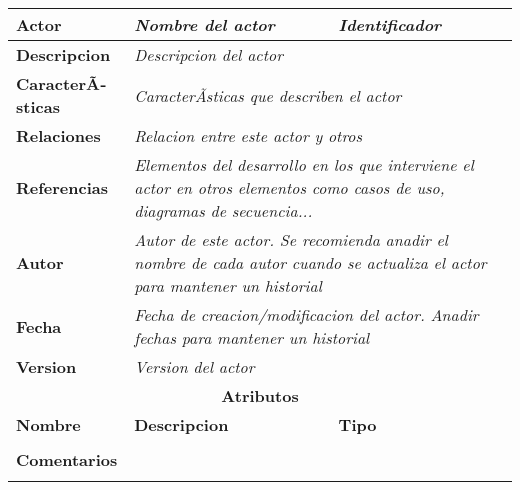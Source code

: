 \begin{tabular}{ l | l | l }
\hline
\textbf{Actor} & \textit{Nombre del actor} & \textit{Identificador} \\ \hline
\textbf{Descripcion} & \multicolumn{2}{l}{\textit{Descripcion del actor}} \\ \hline
\textbf{CaracterÃ­sticas} & \multicolumn{2}{l}{\textit{CaracterÃ­sticas que describen el actor}} \\ \hline
\textbf{Relaciones} & \multicolumn{2}{l}{\textit{Relacion entre este actor y otros}} \\ \hline
\textbf{Referencias} & \multicolumn{2}{l}{\textit{Elementos del desarrollo en los que
interviene el actor en otros elementos como casos de uso, diagramas de secuencia...}} \\ \hline
\textbf{Autor} & \multicolumn{2}{l}{\textit{Autor de este actor. Se recomienda anadir el nombre de cada autor cuando se actualiza el actor para mantener un historial}} \\ \hline
\textbf{Fecha} & \multicolumn{2}{l}{\textit{Fecha de creacion/modificacion del actor. Anadir fechas para mantener un historial}} \\ \hline
\textbf{Version} & \multicolumn{2}{l}{\textit{Version del actor}} \\  \hline
\multicolumn{3}{c}{\textbf{Atributos}}\\ \hline
\textbf{Nombre} & \textbf{Descripcion} & \textbf{Tipo} \\ \hline
& & \\
\multicolumn{2}{l}{\textbf{Comentarios}} \\ \hline
\multicolumn{2}{l}{} \\
\end{tabular}
